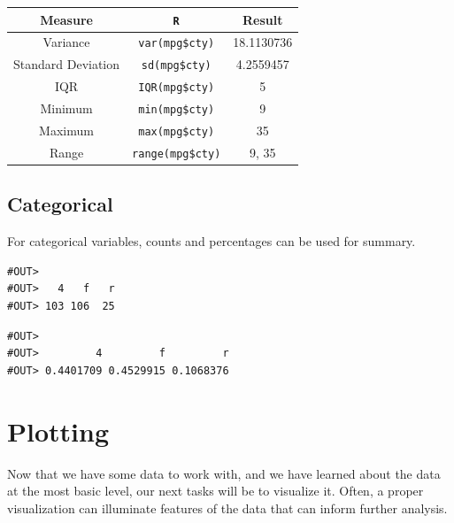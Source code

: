 \documentclass[]{book}
\newenvironment{Shaded}{\begin{snugshade}}{\end{snugshade}}
\newcommand{\KeywordTok}[1]{\textcolor[rgb]{0.13,0.29,0.53}{\textbf{#1}}}
\newcommand{\NormalTok}[1]{#1}
\newcommand{\OperatorTok}[1]{\textcolor[rgb]{0.81,0.36,0.00}{\textbf{#1}}}
\newcommand{\StringTok}[1]{\textcolor[rgb]{0.31,0.60,0.02}{#1}}
\begin{document}
\begin{longtable}[]{@{}ccc@{}}
\toprule
Measure & \texttt{R} & Result\tabularnewline
\midrule
\endhead
Variance & \texttt{var(mpg\$cty)} & 18.1130736\tabularnewline
Standard Deviation & \texttt{sd(mpg\$cty)} & 4.2559457\tabularnewline
IQR & \texttt{IQR(mpg\$cty)} & 5\tabularnewline
Minimum & \texttt{min(mpg\$cty)} & 9\tabularnewline
Maximum & \texttt{max(mpg\$cty)} & 35\tabularnewline
Range & \texttt{range(mpg\$cty)} & 9, 35\tabularnewline
\bottomrule
\end{longtable}

\hypertarget{categorical}{%
\subsection*{Categorical}\label{categorical}}

For categorical variables, counts and percentages can be used for summary.

\begin{Shaded}
\end{Shaded}

\begin{verbatim}
#OUT> 
#OUT>   4   f   r 
#OUT> 103 106  25
\end{verbatim}

\begin{Shaded}
\end{Shaded}

\begin{verbatim}
#OUT> 
#OUT>         4         f         r 
#OUT> 0.4401709 0.4529915 0.1068376
\end{verbatim}

\hypertarget{plotting}{%
\section{Plotting}\label{plotting}}

Now that we have some data to work with, and we have learned about the data at the most basic level, our next tasks will be to visualize it. Often, a proper visualization can illuminate features of the data that can inform further analysis.
\end{document}
